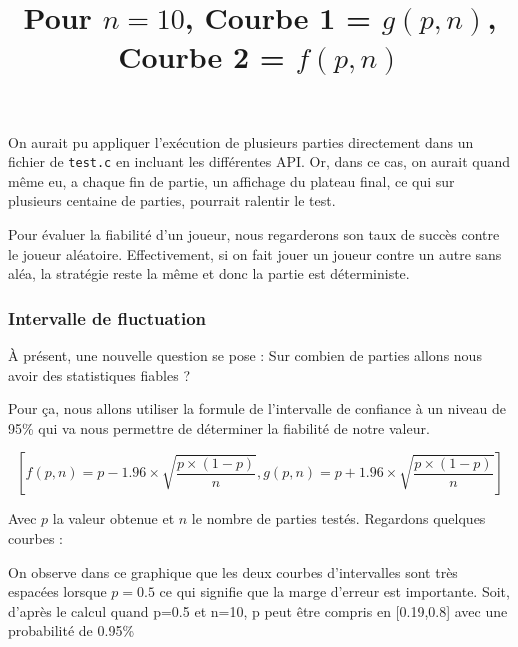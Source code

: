 \documentclass{report}
\begin{document}
On aurait pu appliquer l'exécution de plusieurs parties directement dans un fichier de \texttt{test.c} en incluant les différentes API. Or, dans ce cas, on aurait quand même eu, a chaque fin de partie, un affichage du plateau final, ce qui sur plusieurs centaine de parties, pourrait ralentir le test. \newline

Pour évaluer la fiabilité d'un joueur, nous regarderons son taux de succès contre le joueur aléatoire. Effectivement, si on fait jouer un joueur contre un autre sans aléa, la stratégie reste la même et donc la partie est déterministe.

\subsubsection{Intervalle de fluctuation}
À présent, une nouvelle question se pose : Sur combien de parties allons nous avoir des statistiques fiables ?

Pour ça, nous allons utiliser la formule de l'intervalle de confiance à un niveau de 95\% qui va nous permettre de déterminer la fiabilité de notre valeur.

\begin{equation}
    \left[f(p,n) = p-1.96\times\sqrt{\frac{p\times(1-p)}{n}} ,  g(p,n) = p+1.96\times\sqrt{\frac{p\times(1-p)}{n}} \right]
\end{equation}

Avec $p$ la valeur obtenue et $n$ le nombre de parties testés.
\newline
\newline
Regardons quelques courbes :
\newline


\begin{center}
\begin{center}
    \title{Pour $n=10$, Courbe 1 = $g(p,n)$, Courbe 2 = $f(p,n)$}
\end{center}
\end{center}
On observe dans ce graphique que les deux courbes d'intervalles sont très espacées lorsque $p=0.5$ ce qui signifie que la marge d'erreur est importante. Soit, d'après le calcul quand p=0.5 et n=10, p peut être compris en [0.19,0.8] avec une probabilité de 0.95\% \newline
\end{document}
